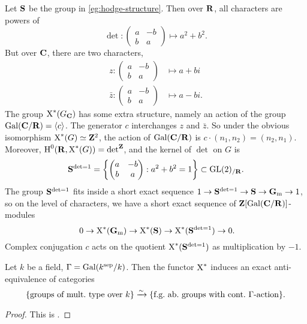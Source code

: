 \begin{example}
Let $\mathbf{S}$ be the group in \autoref{eg:hodge-structure}. Then over $\mathbf{R}$, all 
characters are powers of 
\[
  \det:\begin{pmatrix} a & -b \\ b & a \end{pmatrix}\mapsto a^2 + b^2 .
\]
But over $\mathbf{C}$, there are two characters, 
\begin{align*}
  z:\begin{pmatrix} a & -b \\ b & a \end{pmatrix} &\mapsto a+b i \\
  \bar z:\begin{pmatrix} a & -b \\ b & a \end{pmatrix} &\mapsto a - b i .
\end{align*}
The group $\operatorname{X}^\ast(G_{\mathbf{C}})$ has some extra 
structure, namely an action of the group $\operatorname{Gal}(\mathbf{C}/\mathbf{R})=\langle c\rangle$. 
The generator $c$ interchanges $z$ and $\bar z$. So under the obvious 
isomorphism $\operatorname{X}^\ast(G)\simeq \mathbf{Z}^2$, the action of 
$\operatorname{Gal}(\mathbf{C}/\mathbf{R})$ is $c\cdot(n_1,n_2) = (n_2,n_1)$. Moreover, 
$\operatorname{H}^0(\mathbf{R},\operatorname{X}^\ast(G)) = \det^{\mathbf{Z}}$, and the kernel of $\det$ on $G$ is 
\[
  \mathbf{S}^{\det=1} = \left\{\begin{pmatrix} a & -b \\ b & a \end{pmatrix}:a^2+b^2=1\right\}\subset \operatorname{GL}(2)_{/\mathbf{R}} .
\]
The group $\mathbf{S}^{\det=1}$ fits inside a short exact sequence 
$1\to \mathbf{S}^{\det=1}\to \mathbf{S}\to \mathbf{G}_\mathrm{m}\to 1$, so on the level of characters, we 
have a short exact sequence of $\mathbf{Z}[\operatorname{Gal}(\mathbf{C}/\mathbf{R})]$-modules 
\[\
  0 \to \operatorname{X}^\ast(\mathbf{G}_\mathrm{m}) \to \operatorname{X}^\ast(\mathbf{S}) \to \operatorname{X}^\ast(\mathbf{S}^{\det=1}) \to 0.
\]
Complex conjugation $c$ acts on the quotient 
$\operatorname{X}^\ast(\mathbf{S}^{\det=1})$ as multiplication by $-1$. 
\end{example}

\begin{theorem}
Let $k$ be a field, $\Gamma=\operatorname{Gal}(k^\mathrm{sep}/k)$. Then the functor 
$\operatorname{X}^\ast$ induces an exact anti-equivalence of categories 
\[
  \{\text{groups of mult.~type over $k$}\} \xrightarrow\sim \{\text{f.g.~ab.~groups with cont.~$\Gamma$-action}\} .
\]
\end{theorem}
\begin{proof}
This is \cite[X 1.4]{sga3-ii}. 
\end{proof}

